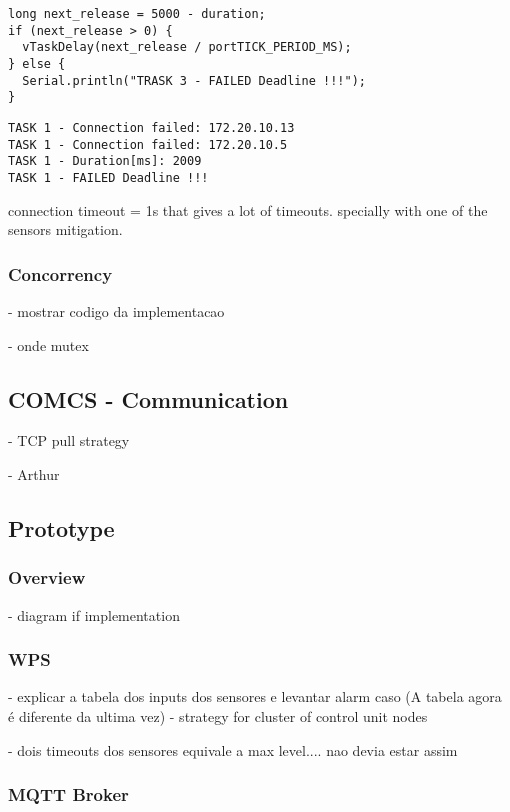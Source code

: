 \documentclass[11pt]{article}
\begin{document}
\begin{verbatim}
long next_release = 5000 - duration;
if (next_release > 0) {
  vTaskDelay(next_release / portTICK_PERIOD_MS);
} else {
  Serial.println("TRASK 3 - FAILED Deadline !!!");
}
\end{verbatim}

\begin{verbatim}
TASK 1 - Connection failed: 172.20.10.13
TASK 1 - Connection failed: 172.20.10.5
TASK 1 - Duration[ms]: 2009
TASK 1 - FAILED Deadline !!!
\end{verbatim}


connection timeout = 1s
that gives a lot of timeouts. specially with one of the sensors
mitigation.

\subsubsection{Concorrency}

- mostrar codigo da implementacao

- onde mutex

\subsection{COMCS - Communication}

- TCP pull strategy

- Arthur

\subsection{Prototype}

\subsubsection{Overview}

- diagram if implementation

\subsubsection{WPS}

- explicar a tabela dos inputs dos sensores e levantar alarm caso (A tabela agora é diferente da ultima vez)
- strategy for cluster of control unit nodes

- dois timeouts dos sensores equivale a max level.... nao devia estar assim

\subsubsection{MQTT Broker}
\end{document}
